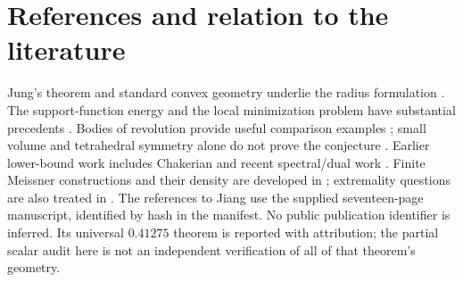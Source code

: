 \documentclass[11pt]{article}
\theoremstyle{remark}\newtheorem{remark}[theorem]{Remark}
\begin{document}
\section{References and relation to the literature}
Jung's theorem and standard convex geometry underlie the radius formulation \cite{Jung,Schneider}. The support-function energy and the local minimization problem have substantial precedents \cite{Bayen,AnciauxGuilfoyle}. Bodies of revolution provide useful comparison examples \cite{AnciauxGeorgiou}; small volume and tetrahedral symmetry alone do not prove the conjecture \cite{Arman}. Earlier lower-bound work includes Chakerian and recent spectral/dual work \cite{Chakerian,Nishioka}. Finite Meissner constructions and their density are developed in \cite{Montejano,HyndDensity}; extremality questions are also treated in \cite{HyndExtreme}.
The references to Jiang use the supplied seventeen-page manuscript, identified by hash in the manifest. No public publication identifier is inferred. Its universal $0.41275$ theorem is reported with attribution; the partial scalar audit here is not an independent verification of all of that theorem's geometry.
\end{document}
